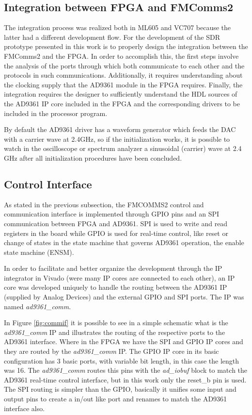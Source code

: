 \subsection{Integration between FPGA and FMComms2}

The integration process was realized both in ML605 and VC707 because the latter
had a different development flow. For the development of the SDR prototype
presented in this work is to properly design the integration between the
FMComms2 and the FPGA. In order to accomplish this, the first steps involve the
analysis of the ports through which both communicate to each other and the
protocols in such communications. Additionally, it requires understanding about
the clocking supply that the AD9361 module in the FPGA requires. Finally, the
integration requires the designer to sufficiently understand the HDL sources of
the AD9361 IP core included in the FPGA and the corresponding drivers to be
included in the processor program.

By default the AD9361 driver has a waveform generator which feeds the DAC with a
carrier wave at 2.4GHz, so if the initialization works, it is possible to watch
in the oscilloscope or spectrum analyzer a sinusoidal (carrier) wave at 2.4 GHz
after all initialization procedures have been concluded.

\subsection{Control Interface}
\label{subs:controlif}

As stated in the previous subsection, the FMCOMMS2 control and communication
interface is implemented through GPIO pins and an SPI communication between FPGA
and AD9361. SPI is used to write and read registers in the board while GPIO is
used for real-time control, like reset or change of states in the state machine
that governs AD9361 operation, the enable state machine (ENSM).

In order to facilitate and better organize the development through the IP
integrator in Vivado (were many IP cores are connected to each other), an IP
core was developed uniquely to handle the routing between the AD9361 IP
(supplied by Analog Devices) and the external GPIO and SPI ports. The IP was
named \emph{ad9361\_comm}.

In Figure \ref{fig:commif} it is possible to see in a simple schematic what is
the \emph{ad9361\_comm} IP and illustrates the routing of the respective ports
to the AD9361 interface. Where in the FPGA we have the SPI and GPIO IP cores
and they are routed by the \emph{ad9361\_comm} IP. The GPIO IP core in its
basic configuration has 3 basic ports, with variable bit length,  in this case
the length was 16. The \emph{ad9361\_comm} routes this pins with the
\emph{ad\_iobuf} block to match the AD9361 real-time control interface, but in
this work only the reset\_b pin is used. The SPI routing is simpler than the
GPIO, basically it unifies some input and output pins to create a in/out like
port and renames to match the AD9361 interface also.


